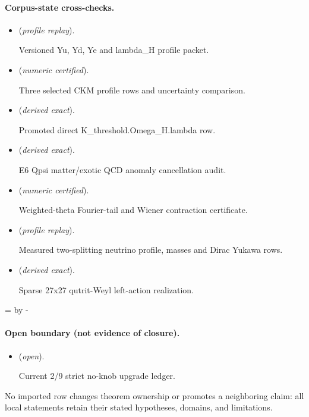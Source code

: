 \documentclass[11pt]{article}
\begin{document}
\paragraph{Corpus-state cross-checks.}
\begin{itemize}
\setlength{\itemsep}{0.25em}
\item {} (\emph{profile replay}).\par Versioned Yu, Yd, Ye and lambda\_H profile packet.
\item {} (\emph{numeric certified}).\par Three selected CKM profile rows and uncertainty comparison.
\item {} (\emph{derived exact}).\par Promoted direct K\_threshold.Omega\_H.lambda row.
\item {} (\emph{derived exact}).\par E6 Qpsi matter/exotic QCD anomaly cancellation audit.
\item {} (\emph{numeric certified}).\par Weighted-theta Fourier-tail and Wiener contraction certificate.
\item {} (\emph{profile replay}).\par Measured two-splitting neutrino profile, masses and Dirac Yukawa rows.
\item {} (\emph{derived exact}).\par Sparse 27x27 qutrit-Weyl left-action realization.
\end{itemize}

\par\begingroup{}=\pagegoal\advance{} by -\pagetotal\ifdim\dimen0<7\baselineskip\newpage\fi\endgroup
\paragraph{Open boundary (not evidence of closure).}
\begin{itemize}
\setlength{\itemsep}{0.25em}
\item {} (\emph{open}).\par Current 2/9 strict no-knob upgrade ledger.
\end{itemize}

No imported row changes theorem ownership or promotes a neighboring claim: all local statements retain their stated hypotheses, domains, and limitations.
\end{document}
